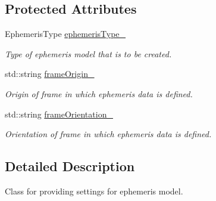 \subsection*{Protected Attributes}
\begin{DoxyCompactItemize}
\item 
Ephemeris\+Type \hyperlink{classtudat_1_1simulation__setup_1_1EphemerisSettings_ac988aa57dc2068b67fcc3515489577e6}{ephemeris\+Type\+\_\+}\hypertarget{classtudat_1_1simulation__setup_1_1EphemerisSettings_ac988aa57dc2068b67fcc3515489577e6}{}\label{classtudat_1_1simulation__setup_1_1EphemerisSettings_ac988aa57dc2068b67fcc3515489577e6}

\begin{DoxyCompactList}\small\item\em Type of ephemeris model that is to be created. \end{DoxyCompactList}\item 
std\+::string \hyperlink{classtudat_1_1simulation__setup_1_1EphemerisSettings_a2a15cbc42f0a7fd548e71b05cad51ce7}{frame\+Origin\+\_\+}\hypertarget{classtudat_1_1simulation__setup_1_1EphemerisSettings_a2a15cbc42f0a7fd548e71b05cad51ce7}{}\label{classtudat_1_1simulation__setup_1_1EphemerisSettings_a2a15cbc42f0a7fd548e71b05cad51ce7}

\begin{DoxyCompactList}\small\item\em Origin of frame in which ephemeris data is defined. \end{DoxyCompactList}\item 
std\+::string \hyperlink{classtudat_1_1simulation__setup_1_1EphemerisSettings_ad492ff71210dd4d1b84275c7864cae6c}{frame\+Orientation\+\_\+}\hypertarget{classtudat_1_1simulation__setup_1_1EphemerisSettings_ad492ff71210dd4d1b84275c7864cae6c}{}\label{classtudat_1_1simulation__setup_1_1EphemerisSettings_ad492ff71210dd4d1b84275c7864cae6c}

\begin{DoxyCompactList}\small\item\em Orientation of frame in which ephemeris data is defined. \end{DoxyCompactList}\end{DoxyCompactItemize}


\subsection{Detailed Description}
Class for providing settings for ephemeris model. 


